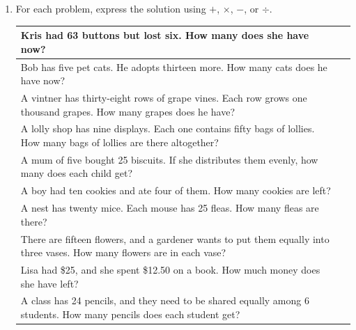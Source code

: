 \documentclass{tufte-book}
\providecommand{\tabularnewline}{\\}
\begin{document}
\begin{enumerate}
\item For each problem, express the solution using $+$, $\times$, $-$, or $\div$.\par\bigskip
{}
\begin{fullwidth}
\begin{tabular}{>{}p{}>{\centering}b{}}
  \toprule
  Kris had 63 buttons but lost six. How many does she have now? & \tabularnewline
  \midrule
  Bob has five pet cats. He adopts thirteen more. How many cats does he have now? & \tabularnewline
  \midrule
  A vintner has thirty-eight rows of grape vines. Each row grows one thousand grapes. How many grapes does he have? & \tabularnewline
  \midrule
  A lolly shop has nine displays. Each one contains fifty bags of lollies. How many bags of lollies are there altogether? & \tabularnewline
  \midrule
  A mum of five bought 25 biscuits. If she distributes them evenly, how many does each child get? & \tabularnewline
  \midrule
  A boy had ten cookies and ate four of them. How many cookies are left? & \tabularnewline
  \midrule
  A nest has twenty mice. Each mouse has 25 fleas. How many fleas are there? & \tabularnewline
  \midrule
  There are fifteen flowers, and a gardener wants to put them equally into three vases. How many flowers are in each vase? & \tabularnewline
  \midrule
  Lisa had \$25, and she spent \$12.50 on a book. How much money does she have left? & \tabularnewline
  \midrule
  A class has 24 pencils, and they need to be shared equally among 6 students. How many pencils does each student get? & \tabularnewline
  \bottomrule
\end{tabular}
\end{fullwidth}
\end{enumerate}
\end{document}
